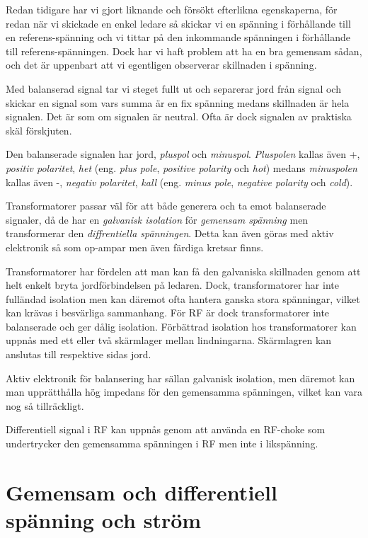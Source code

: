 Redan tidigare har vi gjort liknande och försökt efterlikna
egenskaperna, för redan när vi skickade en enkel ledare så skickar vi en
spänning i förhållande till en referens-spänning och vi tittar på den
inkommande spänningen i förhållande till referens-spänningen. Dock har vi haft
problem att ha en bra gemensam sådan, och det är uppenbart att vi egentligen
observerar skillnaden i spänning.

Med balanserad signal tar vi steget fullt ut och separerar jord från signal
och skickar en signal som vars summa är en fix spänning medans skillnaden är
hela signalen. Det är som om signalen är neutral. Ofta är dock signalen av
praktiska skäl förskjuten.

Den balanserade signalen har jord, \emph{pluspol} och \emph{minuspol}.
\emph{Pluspolen} kallas även +, \emph{positiv polaritet}, \emph{het} (eng.
\emph{plus pole}, \emph{positive polarity} och \emph{hot}) medans
\emph{minuspolen} kallas även -, \emph{negativ polaritet}, \emph{kall} (eng.
\emph{minus pole}, \emph{negative polarity} och \emph{cold}).

Transformatorer passar väl för att både generera och ta emot balanserade
signaler, då de har en \emph{galvanisk isolation} för \emph{gemensam spänning}
men transformerar den \emph{diffrentiella spänningen}. Detta kan även göras med
aktiv elektronik så som op-ampar men även färdiga kretsar finns.

Transformatorer har fördelen att man kan få den galvaniska skillnaden genom
att helt enkelt bryta jordförbindelsen på ledaren. Dock, transformatorer har
inte fulländad isolation men kan däremot ofta hantera ganska stora spänningar,
vilket kan krävas i besvärliga sammanhang. För RF är dock transformatorer inte
balanserade och ger dålig isolation. Förbättrad isolation hos transformatorer
kan uppnås med ett eller två skärmlager mellan lindningarna. Skärmlagren kan anslutas till respektive sidas jord.

Aktiv elektronik för balansering har sällan galvanisk isolation, men däremot
kan man upprätthålla hög impedans för den gemensamma spänningen, vilket kan
vara nog så tillräckligt.

Differentiell signal i RF kan uppnås genom att använda en RF-choke som
undertrycker den gemensamma spänningen i RF men inte i likspänning.

\section{Gemensam och differentiell spänning och ström}

